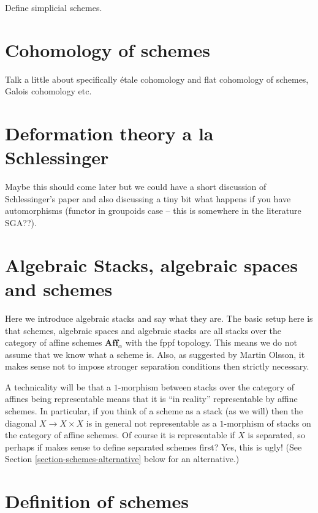 \medskip\noindent
Define simplicial schemes.

\section{Cohomology of schemes}
\label{section-schemes-cohomology}

\noindent
Talk a little about specifically \'etale cohomology and flat cohomology
of schemes, Galois cohomology etc.

\section{Deformation theory a la Schlessinger}
\label{section-deformation-schlessinger}

\noindent
Maybe this should come later but we could have a short discussion of 
Schlessinger's paper and also discussing a tiny bit what happens if 
you have automorphisms (functor in groupoids case -- this is somewhere
in the literature SGA??).

\section{Algebraic Stacks, algebraic spaces and schemes}
\label{section-algebraic-stacks}

\noindent
Here we introduce algebraic stacks and say what they are. The basic setup
here is that schemes, algebraic spaces and algebraic stacks are all
stacks over the category of affine schemes $\textbf{Aff}_\alpha$ with
the fppf topology. This means we do not assume that we know what a scheme
is. Also, as suggested by Martin Olsson, it makes sense not to impose 
stronger separation conditions then strictly necessary.

\medskip\noindent
A technicality will be that a $1$-morphism between stacks over the category
of affines being representable means that it is ``in reality'' representable
by affine schemes. In particular, if you think of a scheme as a stack (as we
will) then the diagonal $X \to X\times X$ is in general not representable as
a $1$-morphism of stacks on the category of affine schemes. Of course it is
representable if $X$ is separated, so perhaps if makes sense to define 
separated schemes first? Yes, this is ugly! (See
Section \ref{section-schemes-alternative} below for an alternative.)

\section{Definition of schemes}
\label{section-definition-schemes}

